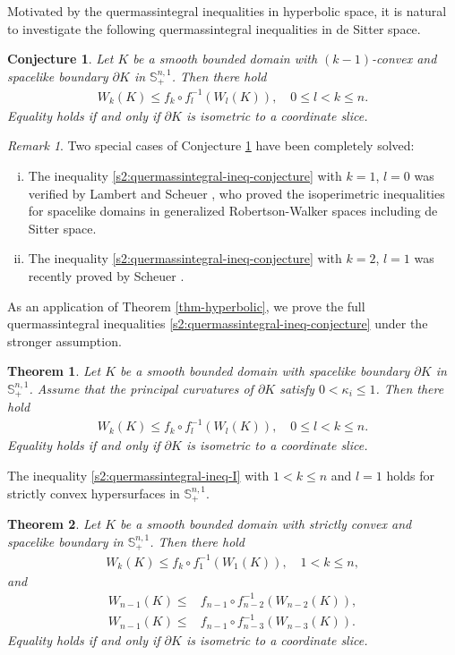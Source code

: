 \documentclass[11pt,reqno]{amsart}
\newtheorem{thm}{Theorem}[section]
\newtheorem{conj}{Conjecture}[section]
\theoremstyle{definition}
\theoremstyle{remark}
\newtheorem{rem}{Remark}
\numberwithin{equation}{section}
\renewcommand{\(}{\left(}
\renewcommand{\)}{\right)}
\renewcommand{\~}{\tilde}
\renewcommand{\-}{\overline}
\renewcommand{\k}{\kappa}
\begin{document}
Motivated by the quermassintegral inequalities in hyperbolic space, it is natural to investigate the following quermassintegral inequalities in de Sitter space.
\begin{conj}\label{s1:conjecture}
Let $K$ be a smooth bounded domain with $(k-1)$-convex and spacelike boundary $\partial K$ in $\mathbb S_{+}^{n,1}$. Then there hold	
\begin{align}\label{s2:quermassintegral-ineq-conjecture}
W_k(K)\leq f_k \circ f_l^{-1}(W_l(K)), \quad 0\leq l<k\leq n. 
\end{align}
Equality holds if and only if $\partial K$ is isometric to a coordinate slice.	
\end{conj}
\begin{rem}
Two special cases of Conjecture \ref{s1:conjecture} have been completely solved: 
\begin{enumerate}[(i)]
	\item The inequality \eqref{s2:quermassintegral-ineq-conjecture} with $k=1$, $l=0$ was verified by Lambert and Scheuer \cite{Lambert-Scheuer2021}, who proved the isoperimetric inequalities for spacelike domains in generalized Robertson-Walker spaces including de Sitter space.
	\item The inequality \eqref{s2:quermassintegral-ineq-conjecture} with $k=2$, $l=1$ was recently proved by Scheuer \cite{Scheuer19}.
\end{enumerate}
\end{rem}
As an application of Theorem \ref{thm-hyperbolic}, we prove the full quermassintegral inequalities \eqref{s2:quermassintegral-ineq-conjecture} under the stronger assumption.
\begin{thm}\label{cor-BS-ineq-deSitter-quermassintegral-ineq}
	Let $K$ be a smooth bounded domain with spacelike boundary $\partial K$ in $\mathbb S_{+}^{n,1}$. Assume that the principal curvatures of $\partial K$ satisfy $0<\k_i\leq 1$. Then there hold	\begin{align}\label{s2:quermassintegral-ineq-I}
	W_k(K)\leq f_k \circ f_l^{-1}(W_l(K)), \quad 0\leq l<k\leq n. 
	\end{align}
	Equality holds if and only if $\partial K$ is isometric to a coordinate slice.
\end{thm}
The inequality \eqref{s2:quermassintegral-ineq-I} with $1<k\leq n$ and $l=1$ holds for strictly convex hypersurfaces in $\mathbb S_{+}^{n,1}$.
\begin{thm}\label{cor-BS-ineq-deSitter-quermassintegral-ineq-II}
	Let $K$ be a smooth bounded domain with strictly convex and spacelike boundary in $\mathbb S^{n,1}_{+}$. Then there hold
	\begin{align}\label{s2:quermassintegral-de-Sitter-ineq-I}
	W_k(K) \leq f_k\circ f_1^{-1}(W_1(K)), \quad  1<k\leq n,
	\end{align}
	and 
	\begin{align}
	W_{n-1}(K) \leq  &f_{n-1}\circ f_{n-2}^{-1}(W_{n-2}(K)), \label{s2:quermassintegral-de-Sitter-ineq-II}\\ W_{n-1}(K) \leq  &f_{n-1}\circ f_{n-3}^{-1}(W_{n-3}(K)). \label{s2:quermassintegral-de-Sitter-ineq-III}
	\end{align}
	Equality holds if and only if $\partial K$ is isometric to a coordinate slice.
\end{thm}
\end{document}
